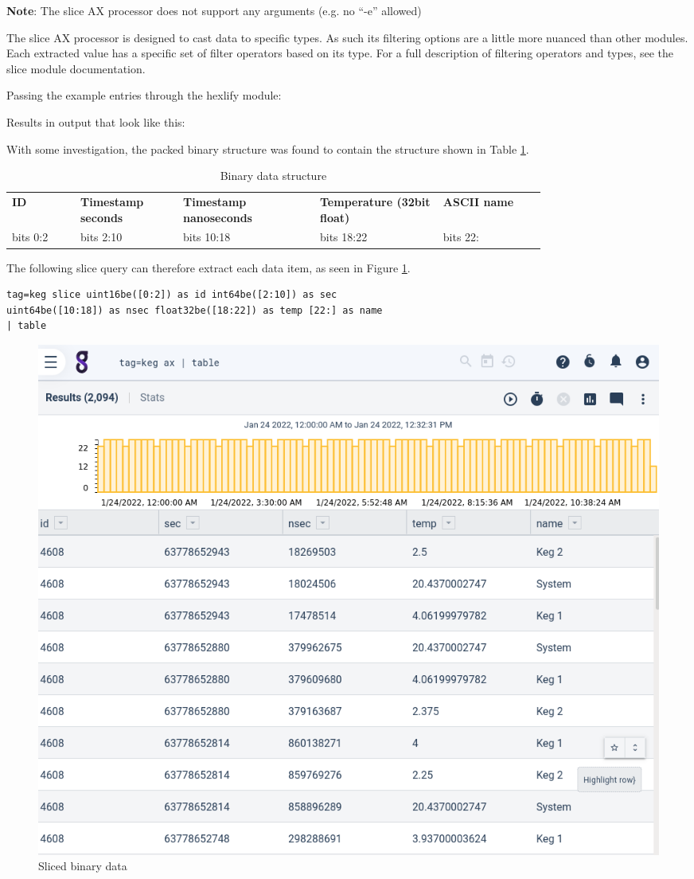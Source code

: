 \textbf{Note}: The slice AX processor does not support any arguments (e.g. no
``-e'' allowed)

The slice AX processor is designed to cast data to specific types. As
such its filtering options are a little more nuanced than other modules.
Each extracted value has a specific set of filter operators based on its
type. For a full description of filtering operators and types, see the
slice module documentation.

Passing the example entries through the hexlify module:


Results in output that look like this:


With some investigation, the packed binary structure was found to
contain the structure shown in Table \ref{table:keg-structure}.

\begin{table}
\begin{tabular}{p{0.1\linewidth}p{0.15\linewidth}p{0.2\linewidth}p{0.18\linewidth}p{0.15\linewidth}}
\hline
\textbf{ID} & \textbf{Timestamp seconds} & \textbf{Timestamp nanoseconds} & \textbf{Temperature (32bit float)} & \textbf{ASCII name} \\
{bits 0:2} & {bits 2:10} & {bits 10:18} & {bits 18:22} & {bits 22:} \\
\hline
\end{tabular}
\caption{Binary data structure}
\label{table:keg-structure}
\end{table}

The following slice query can therefore extract each data item, as seen in Figure \ref{fig:sliced-keg}.

\begin{Verbatim}[breaklines=true]
tag=keg slice uint16be([0:2]) as id int64be([2:10]) as sec 
uint64be([10:18]) as nsec float32be([18:22]) as temp [22:] as name
| table
\end{Verbatim}

\begin{figure}
	\includegraphics[width=0.65\linewidth]{images/sliced-keg.png}
	\caption{Sliced binary data}
	\label{fig:sliced-keg}
\end{figure}

